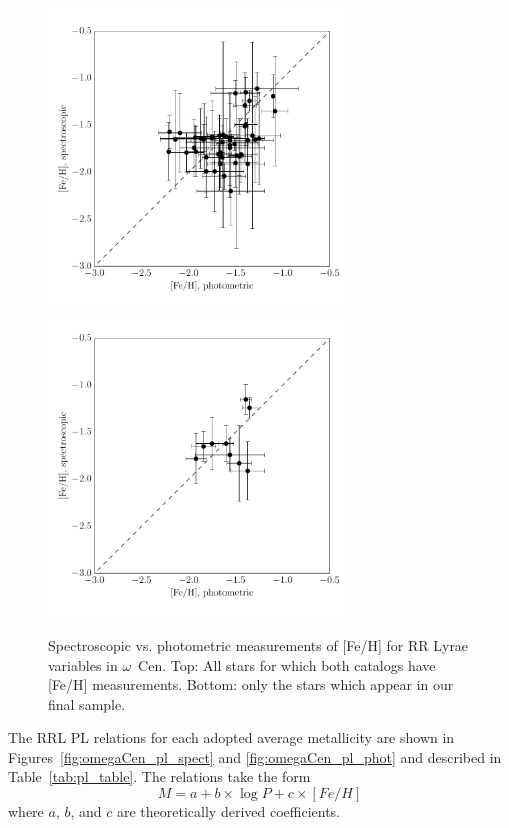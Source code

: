 \documentclass[a4paper,fleqn,usenatbib]{mnras}
\begin{document}
\begin{figure}
\begin{center}
\includegraphics[width=80mm]{final_plots/metallicity_comparison_all.pdf}
\includegraphics[width=80mm]{final_plots/metallicity_comparison_samestars.pdf}
\caption{Spectroscopic vs. photometric measurements of [Fe/H] for RR Lyrae variables in $\omega$~Cen. Top: All stars for which both catalogs have [Fe/H] measurements. Bottom: only the stars which appear in our final sample.}
\label{fig:metallicity_comparison}
\end{center}
\end{figure}


The RRL PL relations for each adopted average metallicity are shown in Figures~\ref{fig:omegaCen_pl_spect} and \ref{fig:omegaCen_pl_phot} and described in Table~\ref{tab:pl_table}. The relations take the form
\begin{equation}M = a + b\times\log P + c\times[Fe/H]\end{equation}
where $a$, $b$, and $c$ are theoretically derived coefficients.
\end{document}

